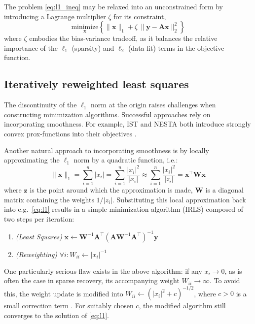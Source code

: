\documentclass[final,5p,times,twocolumn]{elsarticle}
\newcommand{\m}[1]{\boldsymbol{#1}}
\begin{document}
The problem \eqref{eq:l1_ineq} may be relaxed into an unconstrained
form by introducing a Lagrange multiplier $\zeta$ for its constraint,
\begin{equation}
\underset{\m{x}}{\text{minimize}} \left\{
 \|\m{x}\|_1 + \zeta \, \| \m{y} - \m{A} \m{x} \|_2^2
 \right\}
\label{eq:l1_uncon}
\end{equation}
where $\zeta$ embodies the bias-variance tradeoff, as it balances the
relative importance of the $\ell_1$ (sparsity) and $\ell_2$ (data fit)
terms in the objective function.

\subsection{Iteratively reweighted least squares}
\label{subsec:irls}
The discontinuity of the $\ell_1$ norm at the origin raises challenges
when constructing minimization algorithms. Successful approaches rely
on incorporating smoothness. For example, IST and NESTA both introduce
strongly convex prox-functions into their objectives
\cite{beck:siam2009,becker:siam2011}.

Another natural approach to incorporating smoothness is by locally
approximating the $\ell_1$ norm by a quadratic function, i.e.:
\begin{equation}
\|\m{x}\|_1 =
 \sum_{i=1}^n |x_i| =
 \sum_{i=1}^n \frac{|x_i|^2}{|x_i|} \approx
 \sum_{i=1}^n \frac{|x_i|^2}{|z_i|} =
 \m{x}^\top \m{W} \m{x}
\label{eq:l1_local_quad}
\end{equation}
where $\m{z}$ is the point around which the approximation is made,
$\m{W}$ is a diagonal matrix containing the weights $1 / |z_i|$.
Substituting this local approximation back into e.g.~\eqref{eq:l1}
results in a simple minimization algorithm (IRLS) composed of two
steps per iteration:
\begin{enumerate}
 \item \emph{(Least Squares)}
  $\m{x} \gets \m{W}^{-1} \m{A}^\top
  \left( \m{A} \m{W}^{-1} \m{A}^\top \right)^{-1} \m{y}$
 \item \emph{(Reweighting)}
  $\forall i : W_{ii} \gets |x_i|^{-1}$
\end{enumerate}

One particularly serious flaw exists in the above algorithm: if any
$x_i \to 0$, as is often the case in sparse recovery, its accompanying
weight $W_{ii} \to \infty$. To avoid this, the weight update is modified
into $W_{ii} \gets (|x_i|^2 + c)^{-1/2}$, where $c > 0$ is a
small correction term \cite{daubechies:cpam2010}. For suitably chosen
$c$, the modified algorithm still converges to the solution of
\eqref{eq:l1}.
\end{document}

